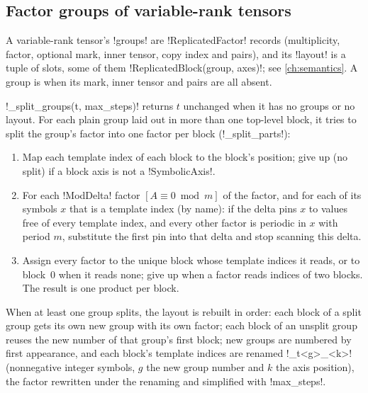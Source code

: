 \subsection{Factor groups of variable-rank tensors}

A variable-rank tensor's \py!groups! are \py!ReplicatedFactor! records (multiplicity, factor, optional mark, inner tensor, copy index and pairs), and its \py!layout! is a tuple of slots, some of them \py!ReplicatedBlock(group, axes)!; see \cref{ch:semantics}. A group is  when its mark, inner tensor and pairs are all absent.

\begin{algorithm}\label{alg:proofs-split-groups}
\py!_split_groups(t, max_steps)! returns $t$ unchanged when it has no groups or no layout. For each plain group laid out in more than one top-level block, it tries to split the group's factor into one factor per block (\py!_split_parts!):
\begin{enumerate}
\item Map each template index of each block to the block's position; give up (no split) if a block axis is not a \py!SymbolicAxis!.
\item For each \py!ModDelta! factor $[A\equiv 0 \bmod m]$ of the factor, and for each of its symbols $x$ that is a template index (by name): if the delta pins $x$ to values free of every template index, and every other factor is periodic in $x$ with period $m$, substitute the first pin into that delta and stop scanning this delta.
\item Assign every factor to the unique block whose template indices it reads, or to block~$0$ when it reads none; give up when a factor reads indices of two blocks. The result is one product per block.
\end{enumerate}
When at least one group splits, the layout is rebuilt in order: each block of a split group gets its own new group with its own factor; each block of an unsplit group reuses the new number of that group's first block; new groups are numbered by first appearance, and each block's template indices are renamed \code!_t<g>_<k>! (nonnegative integer symbols, $g$ the new group number and $k$ the axis position), the factor rewritten under the renaming and simplified with \py!max_steps!.
\end{algorithm}

